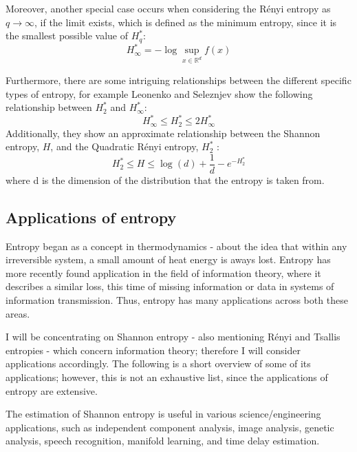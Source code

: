 \documentclass[12pt]{report}
\begin{document}
Moreover, another special case occurs when considering the R\'enyi entropy as $q \to \infty$, if the limit exists, which is defined as the minimum entropy, since it is the smallest possible value of $H_{q}^{*}$:
\begin{equation}
H_{\infty}^{*} = - \log \sup_{x \in \mathbb{R}^d} f (x) \nonumber
\end{equation}

Furthermore, there are some intriguing relationships between the different specific types of entropy, for example Leonenko and Seleznjev \cite{paper5} show the following relationship between $H_{2}^{*}$ and $H_{\infty}^{*}$:
\begin{equation}
H_{\infty}^{*} \leq H_{2}^{*} \leq 2H_{\infty}^{*}
\end{equation}
Additionally, they show an approximate relationship between the Shannon entropy, $H$, and the Quadratic R\'enyi entropy, $ H_{2}^{*}$ :
\begin{equation}
H_{2}^{*} \leq H \leq \log(d) + \frac{1}{d} - e^{-H_{2}^{*}} \nonumber
\end{equation}
where d is the dimension of the distribution that the entropy is taken from.




\subsection{Applications of entropy}

Entropy began as a concept in thermodynamics - about the idea that within any irreversible system, a small amount of heat energy is aways lost. Entropy has more recently found application in the field of information theory, where it describes a similar loss, this time of missing information or data in systems of information transmission. Thus, entropy has many applications across both these areas.

I will be concentrating on Shannon entropy - also mentioning R\'enyi and Tsallis entropies - which concern information theory; therefore I will consider applications accordingly. The following is a short overview of some of its applications; however, this is not an exhaustive list, since the applications of entropy are extensive.

The estimation of Shannon entropy is useful in various science/engineering applications, such as independent component analysis, image analysis, genetic analysis, speech recognition, manifold learning, and time delay estimation.
\end{document}
